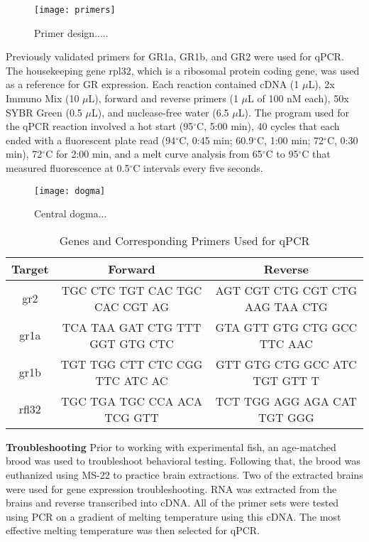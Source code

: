 \documentclass[12pt,twoside]{reedthesis}
\begin{document}
\begin{figure}[htbp] 
\begin{centering} 
\texttt{[image: primers]}
\caption[Primer Design]{Primer design.....} 
\label{subd}
\end{centering} 
\end{figure}

Previously validated primers for GR1a, GR1b, and GR2 were used for qPCR. The
housekeeping gene rpl32, which is a ribosomal protein coding gene, was used as a
reference for GR expression. Each reaction contained cDNA (1 $\mu$L), 2x Immuno Mix (10 $\mu$L),
forward and reverse primers (1 $\mu$L of 100 nM each), 50x SYBR Green (0.5
$\mu$L), and nuclease-free water (6.5 $\mu$L). The program used for the qPCR
reaction involved a hot start (95$^\circ$C, 5:00 min), 40 cycles that each
ended with a fluorescent plate read (94$^\circ$C, 0:45 min; 60.9$^\circ$C, 1:00
min; 72$^\circ$C, 0:30 min), 72$^\circ$C for 2:00 min, and a melt curve analysis from 65$^\circ$C to
95$^\circ$C that measured fluorescence at 0.5$^\circ$C intervals every five seconds.

\begin{figure}[htbp] 
\begin{center} 
\texttt{[image: dogma]}
\caption[Reverse Transcription]{Central dogma...} 
\label{subd}
\end{center} 
\end{figure}

\begin{table}[htbp]
\caption[Genes and Corresponding Primers Used for qPCR]{Genes and Corresponding
  Primers Used for qPCR}
\begin{center}
\footnotesize
\begin{tabular}{ | c | c | c |}
\hline
Target & Forward & Reverse\\
\hline
gr2 & TGC CTC TGT CAC TGC CAC CGT AG & AGT CGT CTG CGT CTG AAG TAA CTG\\
\hline
gr1a & TCA TAA GAT CTG TTT GGT GTG CTC & GTA GTT GTG CTG GCC TTC AAC\\
\hline
gr1b & TGT TGG CTT CTC CGG TTC ATC AC & GTT GTG CTG GCC ATC TGT GTT T\\
\hline
rfl32 & TGC TGA TGC CCA ACA TCG GTT & TCT TGG AGG AGA CAT TGT GGG\\
\hline
\end{tabular}
\end{center}
\end{table}


\noindent\textbf{Troubleshooting}
Prior to working with experimental fish, an age-matched brood was used to
troubleshoot behavioral testing. Following that, the brood was euthanized using
MS-22 to practice brain extractions. Two of the extracted brains were used for
gene expression troubleshooting. RNA was extracted from the brains and reverse
transcribed into cDNA. All of the primer sets were tested using PCR on a gradient of
melting temperature using this cDNA. The most effective melting temperature was
then selected for qPCR.
\end{document}
